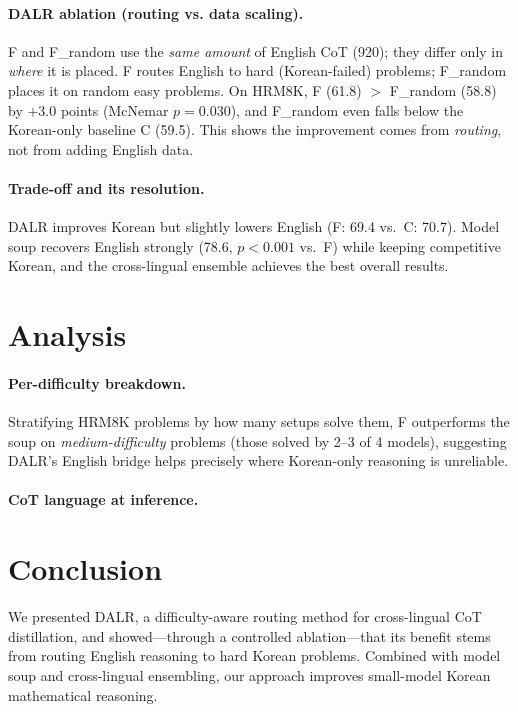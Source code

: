 \documentclass[11pt]{article}
\begin{document}
\paragraph{DALR ablation (routing vs. data scaling).}
F and F\_random use the \emph{same amount} of English CoT (920); they
differ only in \emph{where} it is placed. F routes English to hard
(Korean-failed) problems; F\_random places it on random easy problems.
On HRM8K, F (61.8) $>$ F\_random (58.8) by $+3.0$ points (McNemar
$p{=}0.030$), and F\_random even falls below the Korean-only baseline C
(59.5). This shows the improvement comes from \emph{routing}, not from
adding English data.

\paragraph{Trade-off and its resolution.}
DALR improves Korean but slightly lowers English (F: 69.4 vs.\ C: 70.7).
Model soup recovers English strongly (78.6, $p{<}0.001$ vs.\ F) while
keeping competitive Korean, and the cross-lingual ensemble achieves the
best overall results.

\section{Analysis}
\label{sec:analysis}

\paragraph{Per-difficulty breakdown.}
Stratifying HRM8K problems by how many setups solve them, F outperforms
the soup on \emph{medium-difficulty} problems %
(those solved by 2--3 of 4 models), suggesting DALR's English bridge
helps precisely where Korean-only reasoning is unreliable.

\paragraph{CoT language at inference.} %

\section{Conclusion}
\label{sec:conclusion}
We presented DALR, a difficulty-aware routing method for cross-lingual
CoT distillation, and showed---through a controlled ablation---that its
benefit stems from routing English reasoning to hard Korean problems.
Combined with model soup and cross-lingual ensembling, our approach
improves small-model Korean mathematical reasoning.
\end{document}
